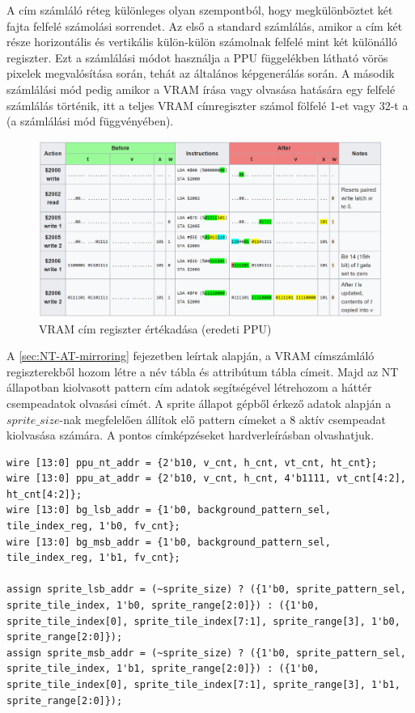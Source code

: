 	A cím számláló réteg különleges olyan szempontból, hogy megkülönböztet két fajta felfelé számolási sorrendet. Az első a standard számlálás, amikor a cím két része horizontális és vertikális külön-külön számolnak felfelé mint két különálló regiszter. Ezt a számlálási módot használja a PPU  függelékben látható vörös pixelek megvalósítása során, tehát az általános képgenerálás során. A második számlálási mód pedig amikor a VRAM írása vagy olvasása hatására egy felfelé számlálás történik, itt a teljes VRAM címregiszter számol fölfelé 1-et vagy 32-t a (a számlálási mód függvényében). 
	
	\begin{figure}[H]
	\centering
	\includegraphics[width=150mm, keepaspectratio]{figures/2000-2005-2006-ppu-reg-writes}
	\caption{VRAM cím regiszter értékadása (eredeti PPU)} 
	\label{fig:2000-2005-2006-ppu-reg-writes}
	\end{figure} 
	
	A \ref{sec:NT-AT-mirroring} fejezetben leírtak alapján, a VRAM címszámláló regiszterekből hozom létre a név tábla és attribútum tábla címeit. Majd az NT  állapotban kiolvasott pattern cím adatok segítségével létrehozom a háttér csempeadatok olvasási címét. A sprite állapot gépből érkező adatok alapján a $sprite\_size$-nak megfelelően állítok elő pattern címeket a 8 aktív csempeadat kiolvasása számára. A pontos címképzéseket  hardverleírásban olvashatjuk.
	
\begin{lstlisting}[caption={VRAM cím képzése a számlálókból és az állapotgépek alapján}, label={code:VRAM-addr}, style=prettyverilog]
wire [13:0] ppu_nt_addr = {2'b10, v_cnt, h_cnt, vt_cnt, ht_cnt};
wire [13:0] ppu_at_addr = {2'b10, v_cnt, h_cnt, 4'b1111, vt_cnt[4:2], ht_cnt[4:2]};
wire [13:0] bg_lsb_addr = {1'b0, background_pattern_sel, tile_index_reg, 1'b0, fv_cnt};
wire [13:0] bg_msb_addr = {1'b0, background_pattern_sel, tile_index_reg, 1'b1, fv_cnt};

assign sprite_lsb_addr = (~sprite_size) ? ({1'b0, sprite_pattern_sel, sprite_tile_index, 1'b0, sprite_range[2:0]}) : ({1'b0, sprite_tile_index[0], sprite_tile_index[7:1], sprite_range[3], 1'b0, sprite_range[2:0]});
assign sprite_msb_addr = (~sprite_size) ? ({1'b0, sprite_pattern_sel, sprite_tile_index, 1'b1, sprite_range[2:0]}) : ({1'b0, sprite_tile_index[0], sprite_tile_index[7:1], sprite_range[3], 1'b1, sprite_range[2:0]});\end{lstlisting}

